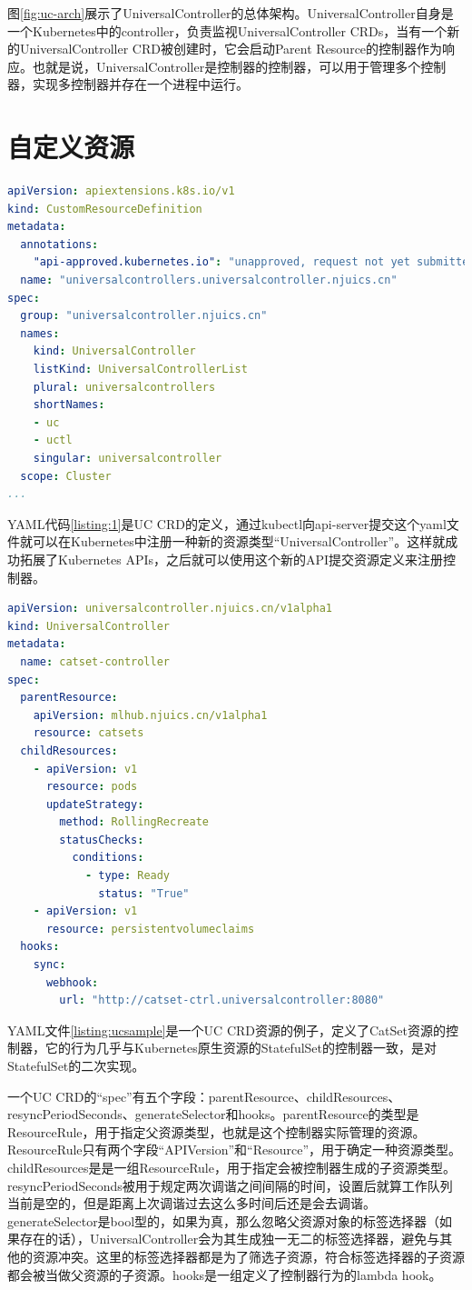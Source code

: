 \documentclass[macfonts,master]{njuthesis}
\begin{document}
图\ref{fig:uc-arch}展示了UniversalController的总体架构。UniversalController自身是一个Kubernetes中的controller，负责监视UniversalController CRDs，当有一个新的UniversalController CRD被创建时，它会启动Parent Resource的控制器作为响应。也就是说，UniversalController是控制器的控制器，可以用于管理多个控制器，实现多控制器并存在一个进程中运行。


\section{自定义资源}
\newpage
\begin{lstlisting}[language=yaml,caption=UC CRD,label=listing:1]
apiVersion: apiextensions.k8s.io/v1
kind: CustomResourceDefinition
metadata:
  annotations:
    "api-approved.kubernetes.io": "unapproved, request not yet submitted"
  name: "universalcontrollers.universalcontroller.njuics.cn"
spec:
  group: "universalcontroller.njuics.cn"
  names:
    kind: UniversalController
    listKind: UniversalControllerList
    plural: universalcontrollers
    shortNames:
    - uc
    - uctl
    singular: universalcontroller
  scope: Cluster
...
\end{lstlisting}

YAML代码\ref{listing:1}是UC CRD的定义，通过kubectl向api-server提交这个yaml文件就可以在Kubernetes中注册一种新的资源类型``UniversalController''。这样就成功拓展了Kubernetes APIs，之后就可以使用这个新的API提交资源定义来注册控制器。

\begin{lstlisting}[language=yaml,caption=作为UC CRD示例的catset-controlelr,label=listing:ucsample]
apiVersion: universalcontroller.njuics.cn/v1alpha1
kind: UniversalController
metadata:
  name: catset-controller
spec:
  parentResource:
    apiVersion: mlhub.njuics.cn/v1alpha1
    resource: catsets
  childResources:
    - apiVersion: v1
      resource: pods
      updateStrategy:
        method: RollingRecreate
        statusChecks:
          conditions:
            - type: Ready
              status: "True"
    - apiVersion: v1
      resource: persistentvolumeclaims
  hooks:
    sync:
      webhook:
        url: "http://catset-ctrl.universalcontroller:8080"
\end{lstlisting}

YAML文件\ref{listing:ucsample}是一个UC CRD资源的例子，定义了CatSet资源的控制器，它的行为几乎与Kubernetes原生资源的StatefulSet的控制器一致，是对StatefulSet的二次实现。

一个UC CRD的``spec''有五个字段：parentResource、childResources、resyncPeriodSeconds、generateSelector和hooks。parentResource的类型是ResourceRule，用于指定父资源类型，也就是这个控制器实际管理的资源。ResourceRule只有两个字段``APIVersion''和``Resource''，用于确定一种资源类型。childResources是是一组ResourceRule，用于指定会被控制器生成的子资源类型。resyncPeriodSeconds被用于规定两次调谐之间间隔的时间，设置后就算工作队列当前是空的，但是距离上次调谐过去这么多时间后还是会去调谐。generateSelector是bool型的，如果为真，那么忽略父资源对象的标签选择器（如果存在的话），UniversalController会为其生成独一无二的标签选择器，避免与其他的资源冲突。这里的标签选择器都是为了筛选子资源，符合标签选择器的子资源都会被当做父资源的子资源。hooks是一组定义了控制器行为的lambda hook。
\end{document}
